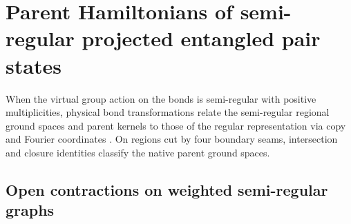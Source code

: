 \chapter{Parent Hamiltonians of semi-regular projected entangled pair states}%
\label{ch:peps_semiregular_parent_hamiltonians}

When the virtual group action on the bonds is semi-regular with positive multiplicities, physical bond transformations relate the semi-regular regional ground spaces and parent kernels to those of the regular representation via copy and Fourier coordinates \cite[Sections~5 and~7]{Schuch2010PEPS}. On regions cut by four boundary seams, intersection and closure identities classify the native parent ground spaces.

\section{Open contractions on weighted semi-regular graphs}%
\label{sec:peps_open_semiregular_contractions}





























